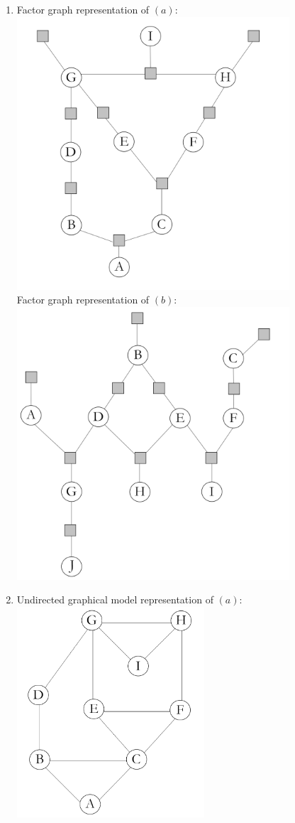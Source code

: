 \documentclass[12pt,letterpaper]{article}
\begin{document}
\begin{enumerate}[label={(\alph*) }]
        \item Factor graph representation of $(a):$ \\
        \includegraphics[width=4in]{2c_a.png}\\
        Factor graph representation of $(b):$ \\
        \includegraphics[width=4in]{2c_b.png} \\
        \newpage
        \item Undirected graphical model representation of $(a):$\\
        \includegraphics[width=2.75in]{2d_a.png}\medskip \\

\end{enumerate}
\end{document}
